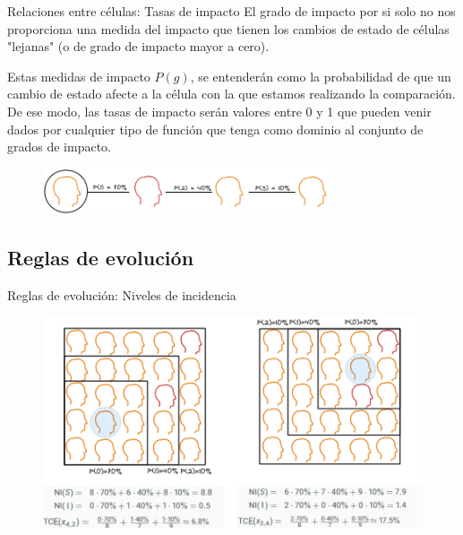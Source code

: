 \documentclass[9pt]{beamer}
\begin{document}
\begin{frame}{Relaciones entre células: Tasas de impacto}
El grado de impacto por si solo no nos proporciona una medida del impacto que tienen los cambios de estado de células "lejanas" (o de grado de impacto mayor a cero). 

Estas medidas de impacto $P(g)$, se entenderán como la probabilidad de que un cambio de estado afecte a la célula con la que estamos realizando la comparación. De ese modo, las tasas de impacto serán valores entre 0 y 1 que pueden venir dados por cualquier tipo de función que tenga como dominio al conjunto de grados de impacto.

\begin{figure}[h]
  \centering
    \includegraphics[width=0.75\textwidth]{Imagenes/tasasGrados.png}
\end{figure} 
\end{frame}

\subsection{Reglas de evolución}

\begin{frame}{Reglas de evolución: Niveles de incidencia}
\begin{figure}[h]
  \centering
    \includegraphics[width=1\textwidth]{Imagenes/nivelesIncidencia.png}
\end{figure}
\end{frame}
\end{document}
